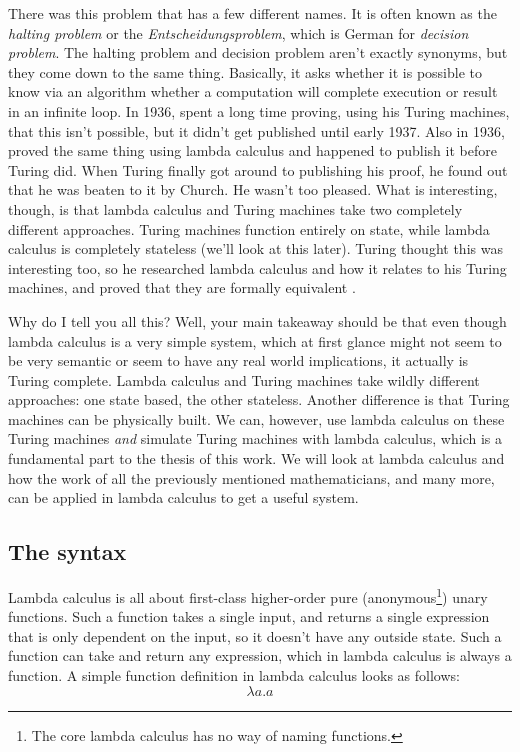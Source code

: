 \documentclass[11pt]{article}
\begin{document}
There was this problem that has a few different names. It is often known as the
\emph{halting problem} or the \emph{Entscheidungsproblem}, which is German for
\emph{decision problem}. The halting problem and decision problem aren't
exactly synonyms, but they come down to the same thing. Basically, it asks
whether it is possible to know via an algorithm whether a computation will
complete execution or result in an infinite loop. In 1936,
\textcite{turing1936, turing1937correction} spent a long time proving, using
his Turing machines, that this isn't possible, but it didn't get published
until early 1937. Also in 1936, \textcite{church1936} proved the same thing
using lambda calculus and happened to publish it before Turing did. When Turing
finally got around to publishing his proof, he found out that he was beaten to
it by Church. He wasn't too pleased. What is interesting, though, is that
lambda calculus and Turing machines take two completely different approaches.
Turing machines function entirely on state, while lambda calculus is completely
stateless (we'll look at this later). Turing thought this was interesting too,
so he researched lambda calculus and how it relates to his Turing machines, and
proved that they are formally equivalent \parencite{turing1937computability}. 

Why do I tell you all this? Well, your main takeaway should be that even though
lambda calculus is a very simple system, which at first glance might not seem
to be very semantic or seem to have any real world implications, it actually is
Turing complete. Lambda calculus and Turing machines take wildly different
approaches: one state based, the other stateless. Another difference is that
Turing machines can be physically built. We can, however, use lambda calculus
on these Turing machines \emph{and} simulate Turing machines with lambda
calculus, which is a fundamental part to the thesis of this work. We will look
at lambda calculus and how the work of all the previously mentioned
mathematicians, and many more, can be applied in lambda calculus to get a
useful system.

\subsection{The syntax}\label{syntax}

Lambda calculus is all about first-class higher-order pure
(anonymous\footnote{The core lambda calculus has no way of naming functions.})
unary functions. Such a function takes a single input, and returns a single
expression that is only dependent on the input, so it doesn't have any outside
state. Such a function can take and return any expression, which in lambda
calculus is always a function. A simple function definition in lambda calculus
looks as follows: \[\lambda a.a\]
\end{document}
